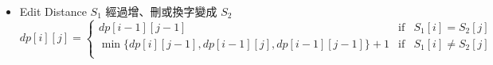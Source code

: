 \begin{itemize}

\item Edit Distance
    $S_1$ 經過增、刪或換字變成 $S_2$
    $dp[i][j] = \left \{
        \begin{array}{lrc}
            dp[i-1][j-1] & \mbox{if} & S_1[i] = S_2[j] \\
            \min\{ dp[i][j-1], dp[i-1][j], dp[i-1][j-1]\}+1 & \mbox{if} & S_1[i] \neq S_2[j] \\
        \end{array}\right .$
    
\end{itemize}